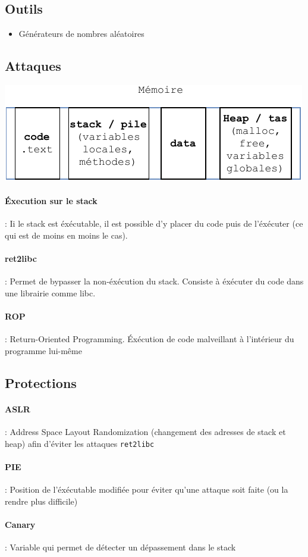 \documentclass[resume]{subfiles}
\begin{document}
\subsection{Outils}
\begin{itemize}
\item Générateurs de nombres aléatoires
\end{itemize}
\subsection{Attaques}
\begin{center}
\includegraphics[width=0.5\columnwidth,page=1]{Schemas-crop.pdf}
\end{center}
\paragraph{Éxecution sur le stack} : Ii le stack est éxécutable, il est possible d'y placer du code puis de l'éxécuter (ce qui est de moins en moins le cas).
\paragraph{ret2libc} : Permet de bypasser la non-éxécution du stack. Consiste à éxécuter du code dans une librairie comme libc.
\paragraph{ROP} : Return-Oriented Programming. Éxécution de code malveillant à l'intérieur du programme lui-même
\subsection{Protections}
\label{sec_protections}
\paragraph{ASLR} : Address Space Layout Randomization (changement des adresses de stack et heap) afin d'éviter les attaques \verb!ret2libc!
\paragraph{PIE} : Position de l'éxécutable modifiée pour éviter qu'une attaque soit faite (ou la rendre plus difficile)
\paragraph{Canary} : Variable qui permet de détecter un dépassement dans le stack
\end{document}
